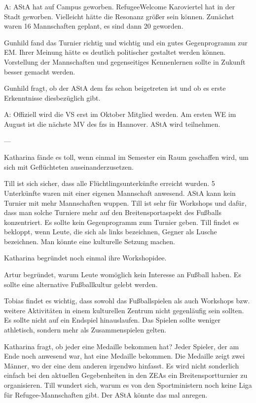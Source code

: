 \documentclass[ngerman,headheight=70pt]{scrartcl}
\begin{document}
    A: AStA hat auf Campus geworben. RefugeeWelcome Karoviertel hat in der Stadt
    geworben. Vielleicht hätte die Resonanz größer sein können. Zunächst waren 16
    Mannschaften geplant, es sind dann 20 geworden.

    Gunhild fand das Turnier richtig und wichtig und ein gutes Gegenprogramm
    zur EM. Ihrer Meinung hätte es deutlich politischer gestaltet werden können.
    Vorstellung der Mannschaften und gegenseitiges Kennenlernen sollte in
    Zukunft besser gemacht werden.

    Gunhild fragt, ob der AStA dem fzs schon beigetreten ist und ob es erste
    Erkenntnisse diesbezüglich gibt.

    A: Offiziell wird die VS erst im Oktober Mitglied werden. Am ersten WE im August
    ist die nächste MV des fzs in Hannover. AStA wird teilnehmen.

    ---

    Katharina fände es toll, wenn einmal im Semester ein Raum geschaffen wird,
    um sich mit Geflüchteten auseinanderzusetzen.

    Till ist sich sicher, dass alle Flüchtlingsunterkünfte erreicht wurden.
    5 Unterkünfte waren mit einer eigenen Mannschaft anwesend. AStA kann kein
    Turnier mit mehr Mannschaften wuppen. Till ist sehr für Workshops und dafür,
    dass man solche Turniere mehr auf den Breitensportaspekt des Fußballs konzentriert.
    Es sollte kein Gegenprogramm zum Turnier geben.
    Till findet es bekloppt, wenn Leute, die sich als links bezeichnen,
    Gegner als Lusche bezeichnen. Man könnte eine kulturelle Setzung machen.

    Katharina begründet noch einmal ihre Workshopidee.

    Artur begründet, warum Leute womöglich kein Interesse an Fußball haben.
    Es sollte eine alternative Fußballkultur gelebt werden.

    Tobias findet es wichtig, dass sowohl das Fußballspielen als auch Workshops
    bzw. weitere Aktivitäten in einem kulturellen Zentrum nicht gegenläufig
    sein sollten. Es sollte nicht auf ein Endspiel hinauslaufen. Das Spielen
    sollte weniger athletisch, sondern mehr als Zusammenspielen gelten.

    Katharina fragt, ob jeder eine Medaille bekommen hat? Jeder Spieler,
    der am Ende noch anwesend war, hat eine Medaille bekommen. Die Medaille
    zeigt zwei Männer, wo der eine dem anderen irgendwo hinfasst. Es wird
    nicht sonderlich einfach bei den aktuellen Gegebenheiten in den
    ZEAs ein Breitensportturnier zu organisieren. Till wundert sich, warum
    es von den Sportministern noch keine Liga für Refugee-Mannschaften gibt.
    Der AStA könnte das mal anregen.
\end{document}

